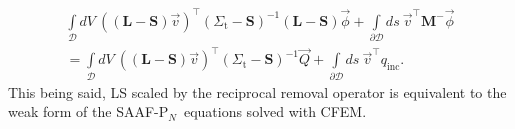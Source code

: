 \documentclass[review]{elsarticle}
\newcommand{\pn}{P$_N$}
\newcommand{\pd}{{\partial\mathcal{D}}}
\newcommand{\intli}[1]{\int\limits_{{#1}}}
\newcommand{\intd}{\int\limits_\mathcal{D}dV\ }
\newcommand{\bs}{\mathbf{S}}
\newcommand{\bl}{\mathbf{L}}
\newcommand{\bst}{\Sigma_\mathrm{t}}
\newcommand{\bmm}{\mathbf{M}^-}
\newcommand{\vq}{\vec{Q}}
\newcommand{\vphi}{\vec{\phi}}
\newcommand{\vt}{\vec{v}}
\newcommand{\qin}{q_\mathrm{inc}}
\begin{document}
%
\begin{align}\label{e:saaf2}
\intd\left((\bl-\bs)\vec{v}\right)^\top(\bst-\bs)^{-1}(\bl-\bs)\vec{\phi}+\intli{\pd}ds\ \vt^\top\bmm\vphi\nonumber\\
=\intd\left((\bl-\bs)\vec{v}\right)^\top(\bst-\bs)^{-1}\vq+\intli{\pd}ds\ \vt^\top\qin.
\end{align}
{This being said, LS  scaled by the reciprocal removal operator} is equivalent to the weak form of the SAAF-\pn\ equations solved with CFEM.
\end{document}
